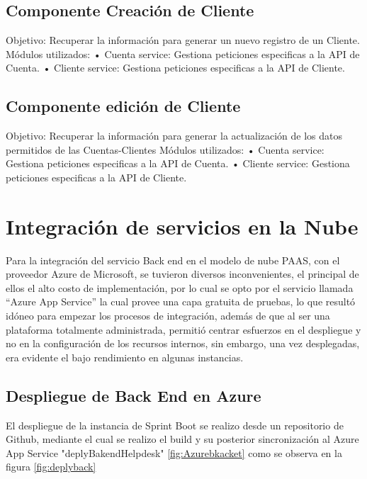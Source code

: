\subsection{Componente  Creación de Cliente}
Objetivo: Recuperar la información para generar un nuevo registro de un Cliente.
\newline
Módulos utilizados: 
\newline
• Cuenta service: Gestiona peticiones especificas a la API de Cuenta.
\newline
• Cliente service: Gestiona peticiones especificas a la API de Cliente.
\subsection{Componente edición de  Cliente}

Objetivo: Recuperar la información para generar la actualización de los datos permitidos de las  Cuentas-Clientes 
\newline
Módulos utilizados: 
\newline
• Cuenta service: Gestiona peticiones especificas a la API de Cuenta.
\newline
• Cliente service: Gestiona peticiones especificas a la API de Cliente.



 \section{Integración de servicios en la Nube}
Para la integración del servicio Back end en el modelo de nube PAAS, con el proveedor Azure de Microsoft, se tuvieron diversos inconvenientes, el principal de ellos el alto costo de implementación, por lo cual se opto por el servicio llamada “Azure App Service” 
la cual provee una capa gratuita de pruebas, lo que resultó idóneo para empezar los 
procesos de integración, además de que al ser una plataforma totalmente administrada, 
permitió centrar esfuerzos en el despliegue y no en la configuración de los recursos 
internos, sin embargo, una vez desplegadas, era evidente el bajo rendimiento en algunas 
instancias. 
\subsection{Despliegue de Back End en Azure}
El despliegue de la instancia de Sprint Boot se realizo desde un repositorio de Github, mediante el cual se realizo el build y su posterior sincronización al  Azure App Service "deplyBakendHelpdesk" \ref{fig:Azurebkacket} como se observa en la figura \ref{fig:deplyback}


